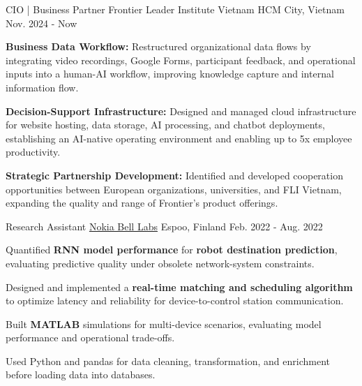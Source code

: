 \begin{cventries}
     \vspace{4mm}
    \cventry
            {CIO | Business Partner} %
            {Frontier Leader Institute Vietnam} %
            {HCM City, Vietnam} %
            {Nov. 2024 - Now} %
            {
                \begin{cvitems} %
                    \item \textbf{Business Data Workflow:} Restructured organizational data flows by integrating video recordings, Google Forms, participant feedback, and operational inputs into a human-AI workflow, improving knowledge capture and internal information flow.
                    \item \textbf{Decision-Support Infrastructure:} Designed and managed cloud infrastructure for website hosting, data storage, AI processing, and chatbot deployments, establishing an AI-native operating environment and enabling up to 5x employee productivity.
                    \item \textbf{Strategic Partnership Development:} Identified and developed cooperation opportunities between European organizations, universities, and FLI Vietnam, expanding the quality and range of Frontier's product offerings.
                \end{cvitems}
            }
    \vspace{4mm}

    \cventry
            {Research Assistant} %
            {\href{https://www.bell-labs.com}{Nokia Bell Labs}} %
            {Espoo, Finland} %
            {Feb. 2022 - Aug. 2022} %
            {
                \begin{cvitems}
                    \item Quantified \textbf{RNN model performance} for \textbf{robot destination prediction}, evaluating predictive quality under obsolete network-system constraints.
                    \item Designed and implemented a \textbf{real-time matching and scheduling algorithm} to optimize latency and reliability for device-to-control station communication.
                    \item Built \textbf{MATLAB} simulations for multi-device scenarios, evaluating model performance and operational trade-offs.
                    \item Used Python and pandas for data cleaning, transformation, and enrichment before loading data into databases.
                \end{cvitems}
            }
    \vspace{4mm}


\end{cventries}
